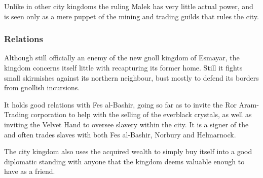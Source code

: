 Unlike in other city kingdoms the ruling Malek has very little actual power,
and is seen only as a mere puppet of the mining and trading guilds that
rules the city.


\subsubsection{Relations}

Although still officially an enemy of the new gnoll kingdom of Esmayar, the
kingdom concerns itself little with recapturing its former home. Still it
fights small skirmishes against its northern neighbour, bust mostly to
defend its borders from gnollish incursions.

It holds good relations with Fes al-Bashir, going so far as to invite the Ror
Aram-Trading corporation to help with the selling of the everblack crystals,
as well as inviting the Velvet Hand to oversee slavery within the city. It is
a signer of the  and often trades slaves with both
Fes al-Bashir, Norbury and Helmarnock.

The city kingdom also uses the acquired wealth to simply buy itself into
a good diplomatic standing with anyone that the kingdom deems valuable enough
to have as a friend.
